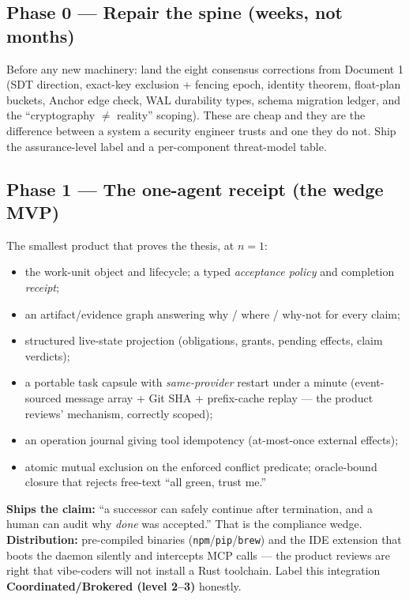 \documentclass[11pt,a4paper]{article}
\begin{document}
\subsection*{Phase 0 --- Repair the spine (weeks, not months)}
Before any new machinery: land the eight consensus corrections from Document 1 (SDT direction, exact-key exclusion + fencing epoch, identity theorem, float-plan buckets, Anchor edge check, WAL durability types, schema migration ledger, and the ``cryptography $\neq$ reality'' scoping). These are cheap and they are the difference between a system a security engineer trusts and one they do not. Ship the assurance-level label and a per-component threat-model table.

\subsection*{Phase 1 --- The one-agent receipt (the wedge MVP)}
The smallest product that proves the thesis, at $n{=}1$:
\begin{itemize}
\item the work-unit object and lifecycle; a typed \emph{acceptance policy} and completion \emph{receipt};
\item an artifact/evidence graph answering why / where / why-not for every claim;
\item structured live-state projection (obligations, grants, pending effects, claim verdicts);
\item a portable task capsule with \emph{same-provider} restart under a minute (event-sourced message array + Git SHA + prefix-cache replay --- the product reviews' mechanism, correctly scoped);
\item an operation journal giving tool idempotency (at-most-once external effects);
\item atomic mutual exclusion on the enforced conflict predicate; oracle-bound closure that rejects free-text ``all green, trust me.''
\end{itemize}
\textbf{Ships the claim:} ``a successor can safely continue after termination, and a human can audit why \emph{done} was accepted.'' That is the compliance wedge. \textbf{Distribution:} pre-compiled binaries (\texttt{npm}/\texttt{pip}/\texttt{brew}) and the IDE extension that boots the daemon silently and intercepts MCP calls --- the product reviews are right that vibe-coders will not install a Rust toolchain. Label this integration \textbf{Coordinated/Brokered (level 2--3)} honestly.
\end{document}
